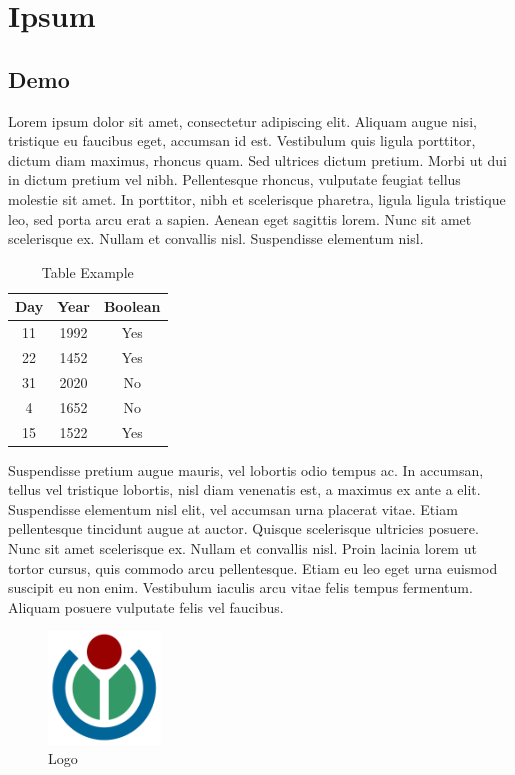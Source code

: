 \chapter{Ipsum}
\label{chap:Ipsum}

\section{Demo}
\label{sec:Demo}

Lorem ipsum dolor sit amet, consectetur adipiscing elit. Aliquam augue nisi,
tristique eu faucibus eget, accumsan id est. Vestibulum quis ligula porttitor,
dictum diam maximus, rhoncus quam. Sed ultrices dictum pretium. Morbi ut dui in
dictum \cite{latexcompanion} pretium vel nibh. Pellentesque rhoncus, vulputate
feugiat tellus molestie sit amet. In porttitor, nibh et scelerisque pharetra,
ligula ligula tristique leo, sed porta arcu erat a sapien. Aenean eget sagittis
lorem. Nunc sit amet scelerisque ex. Nullam et convallis nisl. Suspendisse
elementum nisl.

\begin{table}[h!]
    \centering
    \begin{tabular}{|c c c|}
        \hline
        Day & Year & Boolean \\
        \hline
        11 & 1992 & Yes \\
        22 & 1452 & Yes \\
        31 & 2020 & No \\
        4 & 1652 & No \\
        15 & 1522 & Yes \\
        \hline
    \end{tabular}
    \caption{Table Example}
    \label{table_example}
\end{table}


Suspendisse pretium augue mauris, vel lobortis odio tempus ac. In accumsan,
tellus vel tristique lobortis, nisl diam venenatis est, a maximus ex ante a
elit. Suspendisse elementum nisl elit, vel accumsan urna placerat vitae.
Etiam pellentesque tincidunt augue at auctor. Quisque scelerisque ultricies
posuere. Nunc sit amet scelerisque ex. Nullam et convallis nisl. Proin
lacinia lorem ut tortor cursus, quis commodo arcu pellentesque. Etiam eu
leo eget urna euismod suscipit eu non enim. Vestibulum iaculis arcu vitae
felis tempus fermentum. Aliquam posuere vulputate felis vel faucibus.

\begin{figure}[H]
    \centering
    \includegraphics[width=3cm]{images/logo.png}
    \caption{Logo}
    \label{logo_example}
\end{figure}

